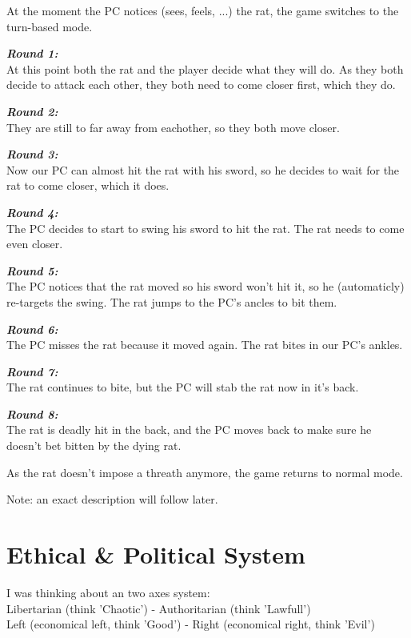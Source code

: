 \documentclass[a4paper]{report}
\newcommand{\nadruk }[1]{\textbf{\emph{#1}}}
\begin{document}
			At the moment the PC notices (sees, feels, ...) the rat, the game switches to  the turn-based mode. 

			\nadruk{Round 1:} \\
			At this point both the rat and the player decide what they will do. As they both decide to attack each other, they both need to come closer first, which they do.

			\nadruk{Round 2:} \\
			They are still to far away from eachother, so they both move closer.

			\nadruk{Round 3:} \\
			Now our PC can almost hit the rat with his sword, so he decides to wait for the rat to come closer, which it does.

			\nadruk{Round 4:} \\
			The PC decides to start to swing his sword to hit the rat. The rat needs to come even closer.

			\nadruk{Round 5:} \\
			The PC notices that the rat moved so his sword won't hit it, so  he (automaticly) re-targets the swing. The rat jumps to the PC's ancles to bit them.

			\nadruk{Round 6:} \\
			The PC misses the rat because it moved again. The rat bites in our PC's ankles. 

			\nadruk{Round 7:} \\
			The rat continues to bite, but the PC will stab the rat now in it's back.

			\nadruk{Round 8:} \\
			The rat is deadly hit in the back, and the PC moves back to make sure he doesn't bet bitten by the dying rat.

			As the rat doesn't impose a threath anymore, the game returns to normal mode.

		Note: an exact description will follow later.

	\chapter{Ethical \& Political System}

		I was thinking about an two axes system: \\
		Libertarian (think 'Chaotic') - Authoritarian (think 'Lawfull') \\
		Left (economical left, think 'Good') - Right (economical right, think 'Evil')
\end{document}
